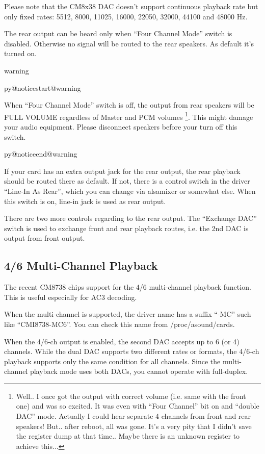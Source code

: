 \documentclass[a4paper,8pt,english]{sphinxmanual}
\makeatletter
\renewenvironment{notice}[2]{%
          \def\py@noticetype{#1}
          \begin{coloredbox}{#1}
          \bf\it
          \par\strong{#2}
          \csname py@noticestart@#1\endcsname
        }
	{
          \csname py@noticeend@\py@noticetype\endcsname
          \end{coloredbox}
        }
\makeatother
\begin{document}
Please note that the CM8x38 DAC doesn't support continuous playback
rate but only fixed rates: 5512, 8000, 11025, 16000, 22050, 32000,
44100 and 48000 Hz.

The rear output can be heard only when ``Four Channel Mode'' switch is
disabled.  Otherwise no signal will be routed to the rear speakers.
As default it's turned on.

\begin{notice}{warning}{Warning:}
When ``Four Channel Mode'' switch is off, the output from rear speakers
will be FULL VOLUME regardless of Master and PCM volumes \footnote[1]{
Well.. I once got the output with correct volume (i.e. same with the
front one) and was so excited.  It was even with ``Four Channel'' bit
on and ``double DAC'' mode.  Actually I could hear separate 4 channels
from front and rear speakers!  But.. after reboot, all was gone.
It's a very pity that I didn't save the register dump at that
time..  Maybe there is an unknown register to achieve this...
}.
This might damage your audio equipment.  Please disconnect speakers
before your turn off this switch.
\end{notice}

If your card has an extra output jack for the rear output, the rear
playback should be routed there as default.  If not, there is a
control switch in the driver ``Line-In As Rear'', which you can change
via alsamixer or somewhat else.  When this switch is on, line-in jack
is used as rear output.

There are two more controls regarding to the rear output.
The ``Exchange DAC'' switch is used to exchange front and rear playback
routes, i.e. the 2nd DAC is output from front output.


\subsection{4/6 Multi-Channel Playback}
\label{sound/cards/cmipci:multi-channel-playback}
The recent CM8738 chips support for the 4/6 multi-channel playback
function.  This is useful especially for AC3 decoding.

When the multi-channel is supported, the driver name has a suffix
``-MC'' such like ``CMI8738-MC6''.  You can check this name from
/proc/asound/cards.

When the 4/6-ch output is enabled, the second DAC accepts up to 6 (or
4) channels.  While the dual DAC supports two different rates or
formats, the 4/6-ch playback supports only the same condition for all
channels.  Since the multi-channel playback mode uses both DACs, you
cannot operate with full-duplex.
\end{document}
